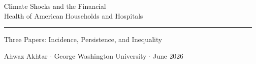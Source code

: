 \documentclass[aspectratio=169,11pt]{beamer}
\begin{document}
\begingroup
{}
\begin{frame}[plain]
  \vspace{0.65cm}
  \hspace{0.6cm}%
  {\color{white}\bfseries\fontsize{22}{28}\selectfont
    \parbox{13cm}{Climate Shocks and the Financial\\Health of American Households and Hospitals}}
  \par\vspace{0.45em}
  \hspace{0.6cm}%
  {\color{WarmOrange}\rule{12cm}{2pt}}
  \par\vspace{0.45em}
  \hspace{0.6cm}%
  {\color{Teal}\normalsize Three Papers: Incidence, Persistence, and Inequality}
  \par\vspace{0.35em}
  \hspace{0.6cm}%
  {\color{WarmGray}\small Ahwaz Akhtar \(\cdot\) George Washington University \(\cdot\) June 2026}
\end{frame}
\endgroup
\end{document}
